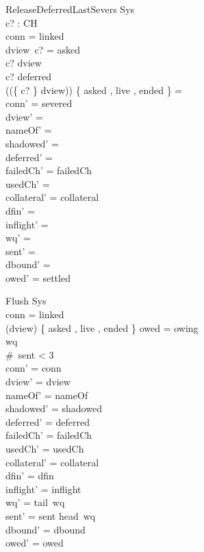 \documentclass[a4paper,10pt,fleqn]{article}
\begin{document}
\begin{schema}{ReleaseDeferredLastSevers}
  \Delta Sys \\
  c? : CH \\
\where
  conn = linked \\
  dview~c? = asked \\
  c? \in \dom dview \\
  c? \in deferred \\
  (\ran (\{ c? \} \ndres dview)) \cap \{ asked , live , ended \} = \emptyset \\
  conn' = severed \\
  dview' = \emptyset \\
  nameOf' = \emptyset \\
  shadowed' = \emptyset \\
  deferred' = \emptyset \\
  failedCh' = failedCh \\
  usedCh' = \emptyset \\
  collateral' = collateral \\
  dfin' = \emptyset \\
  inflight' = \langle \rangle \\
  wq' = \langle \rangle \\
  sent' = \langle \rangle \\
  dbound' = \emptyset \\
  owed' = settled
\end{schema}

\begin{schema}{Flush}
  \Delta Sys \\
\where
  conn = linked \\
  (\ran dview) \cap \{ asked , live , ended \} \neq \emptyset \lor owed = owing \\
  wq \neq \langle \rangle \\
  \#~sent < 3 \\
  conn' = conn \\
  dview' = dview \\
  nameOf' = nameOf \\
  shadowed' = shadowed \\
  deferred' = deferred \\
  failedCh' = failedCh \\
  usedCh' = usedCh \\
  collateral' = collateral \\
  dfin' = dfin \\
  inflight' = inflight \\
  wq' = tail~wq \\
  sent' = sent \cat \langle head~wq \rangle \\
  dbound' = dbound \\
  owed' = owed
\end{schema}
\end{document}
